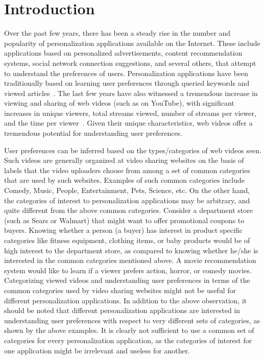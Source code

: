 \section{Introduction}
\label{sec:intro}
Over the past few years, there has been a steady rise in the number and popularity of personalization applications available on the Internet. These include applications based on personalized advertisements, content recommendation systems, social network connection suggestions, and several others, that attempt to understand the preferences of users. Personalization applications have been traditionally based on learning user preferences through queried keywords and viewed articles~\cite{mobasher2000automatic}. The last few years have also witnessed a tremendous increase in viewing and sharing of web videos (such as on YouTube\cite{Youtube}), with significant increases in unique viewers, total streams viewed, number of streams per viewer, and the time per viewer~\cite{Neilson2011}. Given their unique characteristics, web videos offer a tremendous potential for understanding user preferences.

User preferences can be inferred based on the types/categories of web videos seen. Such videos are generally organized at video sharing websites on the basis of labels that the video uploaders choose from among a set of common categories that are used by such websites. Examples of such common categories include Comedy, Music, People, Entertainment, Pets, Science, etc. On the other hand, the categories of interest to personalization applications may be arbitrary, and quite different from the above common categories. Consider a department store (such as Sears or Walmart) that might want to offer promotional coupons to buyers. Knowing whether a person (a buyer) has interest in product specific categories like fitness equipment, clothing items, or baby products would be of high interest to the department store, as compared to knowing whether he/she is interested in the common categories mentioned above. A movie recommendation system would like to learn if a viewer prefers action, horror, or comedy movies. Categorizing viewed videos and understanding user preferences in terms of the common categories used by video sharing websites might not be useful for different personalization applications. In addition to the above observation, it should be noted that different personalization applications are interested in understanding user preferences with respect to very different sets of categories, as shown by the above examples. It is clearly not sufficient to use a common set of categories for every personalization application, as the categories of interest for one application might be irrelevant and useless for another.

